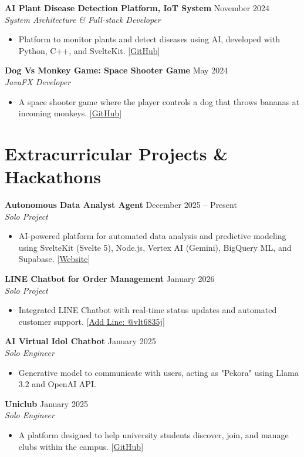 \documentclass[a4paper,10pt]{article}
\newcommand{\project}[3]{
  \vspace{1.2ex}
  \textbf{#1} \hfill #2 \\
  \textit{#3} \par
}
\begin{document}
\project{AI Plant Disease Detection Platform, IoT System}{November 2024}{System Architecture \& Full-stack Developer}
\begin{itemize}
    \item Platform to monitor plants and detect diseases using AI, developed with Python, C++, and SvelteKit. [\href{https://github.com/Chulinuwu/Smart_Farm_Plant_Monitoring_System}{GitHub}]
\end{itemize}

\project{Dog Vs Monkey Game: Space Shooter Game}{May 2024}{JavaFX Developer}
\begin{itemize}
    \item A space shooter game where the player controls a dog that throws bananas at incoming monkeys. [\href{https://github.com/amphikapha/Dog-VS-Monkey}{GitHub}]
\end{itemize}

\section*{Extracurricular Projects \& Hackathons}

\project{Autonomous Data Analyst Agent}{December 2025 -- Present}{Solo Project}
\begin{itemize}
    \item AI-powered platform for automated data analysis and predictive modeling using SvelteKit (Svelte 5), Node.js, Vertex AI (Gemini), BigQuery ML, and Supabase. [\href{https://aurora-analytic-ai.vercel.app/}{Website}]
\end{itemize}

\project{LINE Chatbot for Order Management}{January 2026}{Solo Project}
\begin{itemize}
    \item Integrated LINE Chatbot with real-time status updates and automated customer support. [\href{https://line.me/R/ti/p/@vlt6835j}{Add Line: @vlt6835j}]
\end{itemize}

\project{AI Virtual Idol Chatbot}{January 2025}{Solo Engineer}
\begin{itemize}
    \item Generative model to communicate with users, acting as "Pekora" using Llama 3.2 and OpenAI API.
\end{itemize}

\project{Uniclub}{January 2025}{Solo Engineer}
\begin{itemize}
    \item A platform designed to help university students discover, join, and manage clubs within the campus. [\href{https://github.com/Chulinuwu/UniClubFrontend}{GitHub}]
\end{itemize}
\end{document}
